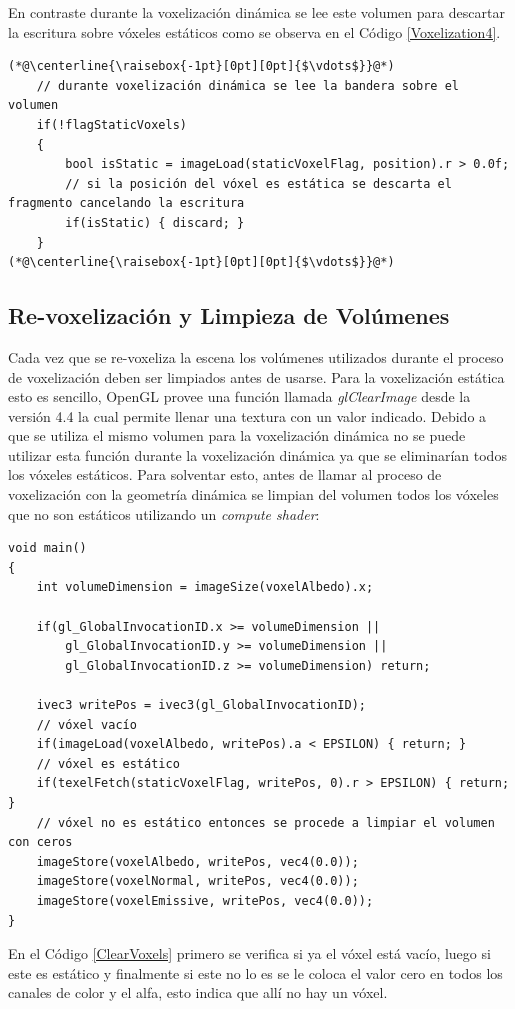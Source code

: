 En contraste durante la voxelización dinámica se lee este volumen para descartar la escritura sobre vóxeles estáticos como se observa en el Código \ref{Voxelization4}.
\\
\begin{lstlisting}[caption={Lectura de la bandera estática durante voxelización de geometría dinámica.}, label=Voxelization4]
(*@\centerline{\raisebox{-1pt}[0pt][0pt]{$\vdots$}}@*)
    // durante voxelización dinámica se lee la bandera sobre el volumen
    if(!flagStaticVoxels)
    {
        bool isStatic = imageLoad(staticVoxelFlag, position).r > 0.0f;
        // si la posición del vóxel es estática se descarta el fragmento cancelando la escritura
        if(isStatic) { discard; }
    }
(*@\centerline{\raisebox{-1pt}[0pt][0pt]{$\vdots$}}@*)
\end{lstlisting}

\subsection{Re-voxelización y Limpieza de Volúmenes}
Cada vez que se re-voxeliza la escena los volúmenes utilizados durante el proceso de voxelización deben ser limpiados antes de usarse. Para la voxelización estática esto es sencillo, OpenGL provee una función llamada \emph{glClearImage} desde la versión 4.4 la cual permite llenar una textura con un valor indicado. Debido a que se utiliza el mismo volumen para la voxelización dinámica no se puede utilizar esta función durante la voxelización dinámica ya que se eliminarían todos los vóxeles estáticos. Para solventar esto, antes de llamar al proceso de voxelización con la geometría dinámica se limpian del volumen todos los vóxeles que no son estáticos utilizando un \emph{compute shader}:
\\
\begin{lstlisting}[caption={Limpieza de vóxeles no estáticos.}, label=ClearVoxels]
void main()
{
    int volumeDimension = imageSize(voxelAlbedo).x;

    if(gl_GlobalInvocationID.x >= volumeDimension ||
        gl_GlobalInvocationID.y >= volumeDimension ||
        gl_GlobalInvocationID.z >= volumeDimension) return;

    ivec3 writePos = ivec3(gl_GlobalInvocationID);
    // vóxel vacío
    if(imageLoad(voxelAlbedo, writePos).a < EPSILON) { return; }
    // vóxel es estático
    if(texelFetch(staticVoxelFlag, writePos, 0).r > EPSILON) { return; }
    // vóxel no es estático entonces se procede a limpiar el volumen con ceros
    imageStore(voxelAlbedo, writePos, vec4(0.0));
    imageStore(voxelNormal, writePos, vec4(0.0));
    imageStore(voxelEmissive, writePos, vec4(0.0));
}
\end{lstlisting}

En el Código \ref{ClearVoxels} primero se verifica si ya el vóxel está vacío, luego si este es estático y finalmente si este no lo es se le coloca el valor cero en todos los canales de color y el alfa, esto indica que allí no hay un vóxel.
